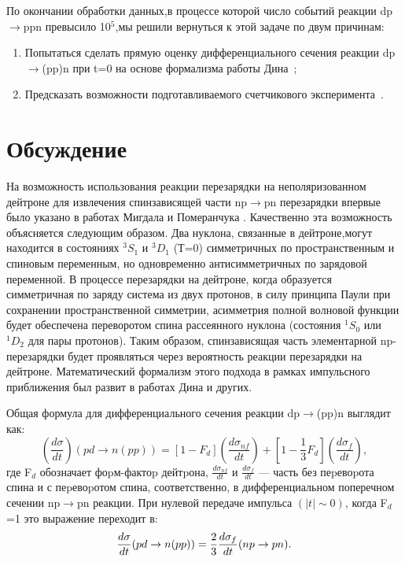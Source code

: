 \documentclass[a4paper,12pt]{article}
\begin{document}
По окончании обработки данных,в процессе которой число событий реакции
dp$\to$ppn превысило 10$^5$,мы решили вернуться к этой задаче по двум причинам:
\begin{enumerate}
\item{Попытаться сделать прямую оценку дифференциального сечения реакции
  dp$\to$(pp)n при t=0 на основе формализма работы Дина~\cite{Dea};}
\item{Предсказать возможности подготавливаемого счетчикового
  эксперимента~\cite{Baz}}.
\end{enumerate}

\section{Обсуждение}
На возможность использования реакции перезарядки на неполяризованном дейтроне
для извлечения спинзависящей части np$\to$pn перезарядки впервые было указано в
работах Мигдала \cite{Mig} и Померанчука \cite{Pom}. Качественно эта возможность
объясняется следующим образом. Два нуклона, связанные в дейтроне,могут находится
в состояниях $^3S_1$ и $^3D_1$ (Т=0) симметричных по пространственным и спиновым
переменным, но одновременно антисимметричных по зарядовой переменной. В процессе
перезарядки на дейтроне, когда образуется симметричная по заряду система из двух
протонов, в силу принципа Паули при сохранении пространственной симметрии,
асимметрия полной волновой функции будет обеспечена переворотом спина
рассеянного нуклона (состояния $^1S_0$ или $^1D_2$ для пары протонов). Таким
образом, спинзависящая часть элементарной np-перезарядки будет проявляться через
вероятность реакции перезарядки на дейтроне. Математический формализм этого
подхода в рамках импульсного приближения был развит в работах Дина \cite{Dea} и
других.

Общая формула для дифференциального сечения реакции dp$\to$(pp)n выглядит как:
\begin{equation}
  \left( \frac{d\sigma }{dt}\right) (pd\rightarrow n(pp))=[1-F_d]\left(
  \frac{d\sigma _{nf}}{dt}\right) +[1-\frac{1}{3}F_d]
  \left(\frac{d\sigma _f}{dt}\right),
\end{equation}
где F$_d$ обозначает фоpм-фактоp дейтpона, $\frac{d\sigma _{nf}}{dt}$ и
$\frac{d\sigma _f}{dt}$ --- часть без пеpевоpота спина и с пеpевоpотом спина,
соответственно, в дифференциальном поперечном сечении np$\to$pn реакции. При
нулевой передаче импульса $(\vert t \vert\sim 0)$, когда F$_d$=1 это выражение
переходит в:
\begin{equation}
  \frac{d\sigma }{dt}(pd\rightarrow n(pp))=\frac 23\frac{d\sigma _f}{%
    dt}(np\rightarrow pn).
\end{equation}
\end{document}
